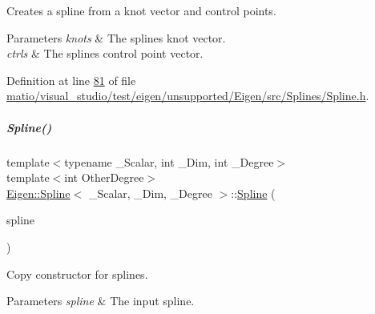 Creates a spline from a knot vector and control points. 


\begin{DoxyParams}{Parameters}
{\em knots} & The spline\textquotesingle{}s knot vector. \\
\hline
{\em ctrls} & The spline\textquotesingle{}s control point vector. \\
\hline
\end{DoxyParams}


Definition at line \hyperlink{matio_2visual__studio_2test_2eigen_2unsupported_2_eigen_2src_2_splines_2_spline_8h_source_l00081}{81} of file \hyperlink{matio_2visual__studio_2test_2eigen_2unsupported_2_eigen_2src_2_splines_2_spline_8h_source}{matio/visual\+\_\+studio/test/eigen/unsupported/\+Eigen/src/\+Splines/\+Spline.\+h}.

\mbox{\label{group___splines___module_a0e6083605acc9f565e8bf4057b3f4bd3}} 
\subparagraph{\texorpdfstring{Spline()}{Spline()}\hspace{0.1cm}{\footnotesize\ttfamily [4/4]}}
{\footnotesize\ttfamily template$<$typename \+\_\+\+Scalar, int \+\_\+\+Dim, int \+\_\+\+Degree$>$ \\
template$<$int Other\+Degree$>$ \\
\hyperlink{group___splines___module_class_eigen_1_1_spline}{Eigen\+::\+Spline}$<$ \+\_\+\+Scalar, \+\_\+\+Dim, \+\_\+\+Degree $>$\+::\hyperlink{group___splines___module_class_eigen_1_1_spline}{Spline} (\begin{DoxyParamCaption}\item[{const \hyperlink{group___splines___module_class_eigen_1_1_spline}{Spline}$<$ \hyperlink{group___splines___module_a8cafd78b564825c76fbb3419653d9742}{Scalar}, \hyperlink{group___splines___module_a82c233f1d4719bc52397d64a6c96c5b0a25366e5e79da5355d259a71096d8d8a7}{Dimension}, Other\+Degree $>$ \&}]{spline }\end{DoxyParamCaption})\hspace{0.3cm}{\ttfamily [inline]}}



Copy constructor for splines. 


\begin{DoxyParams}{Parameters}
{\em spline} & The input spline. \\
\hline
\end{DoxyParams}


